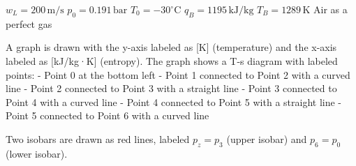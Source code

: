 \( w_L = 200 \, \text{m/s} \)  
\( p_0 = 0.191 \, \text{bar} \)  
\( T_0 = -30^\circ \text{C} \)  
\( q_B = 1195 \, \text{kJ/kg} \)  
\( T_B = 1289 \, \text{K} \)  
Air as a perfect gas  

A graph is drawn with the y-axis labeled as [K] (temperature) and the x-axis labeled as [kJ/kg·K] (entropy). The graph shows a T-s diagram with labeled points:  
- Point 0 at the bottom left  
- Point 1 connected to Point 2 with a curved line  
- Point 2 connected to Point 3 with a straight line  
- Point 3 connected to Point 4 with a curved line  
- Point 4 connected to Point 5 with a straight line  
- Point 5 connected to Point 6 with a curved line  

Two isobars are drawn as red lines, labeled \( p_z = p_3 \) (upper isobar) and \( p_6 = p_0 \) (lower isobar).